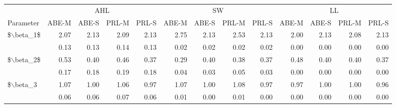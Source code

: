 \begin{tabular}{lrrrrrrrrrrrr}
  \hline
  & \multicolumn{4}{c}{AHL} & \multicolumn{4}{c}{SW} & \multicolumn{4}{c}{LL} \\

                             \cmidrule(lr){2-5}\cmidrule(lr){6-9}\cmidrule(lr){10-13} Parameter& ABE-M & ABE-S & PRL-M & PRL-S& ABE-M & ABE-S & PRL-M & PRL-S& ABE-M & ABE-S & PRL-M & PRL-S\\
 \hline
\$$\backslash$beta\_1\$ & 2.07 & 2.13 & 2.09 & 2.13 & 2.75 & 2.13 & 2.53 & 2.13 & 2.00 & 2.13 & 2.08 & 2.13 \\ 
   & 0.13 & 0.13 & 0.14 & 0.13 & 0.02 & 0.02 & 0.02 & 0.02 & 0.00 & 0.00 & 0.00 & 0.00 \\ 
  \$$\backslash$beta\_2\$ & 0.53 & 0.40 & 0.46 & 0.37 & 0.29 & 0.40 & 0.38 & 0.37 & 0.48 & 0.40 & 0.40 & 0.37 \\ 
   & 0.17 & 0.18 & 0.19 & 0.18 & 0.04 & 0.03 & 0.05 & 0.03 & 0.00 & 0.00 & 0.00 & 0.00 \\ 
  \$$\backslash$beta\_3 & 1.07 & 1.00 & 1.06 & 0.97 & 1.07 & 1.00 & 1.08 & 0.97 & 0.97 & 1.00 & 1.00 & 0.96 \\ 
   & 0.06 & 0.06 & 0.07 & 0.06 & 0.01 & 0.00 & 0.01 & 0.00 & 0.00 & 0.00 & 0.00 & 0.00 \\ 
   \hline
\end{tabular}
